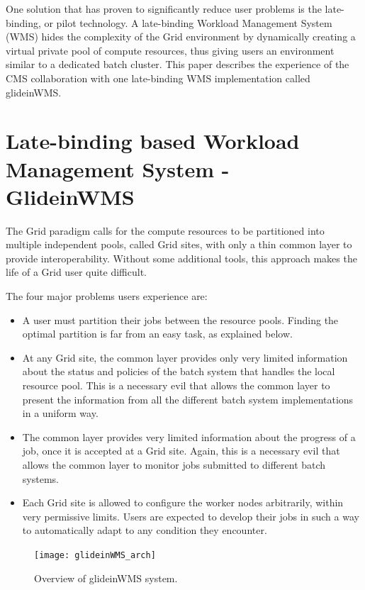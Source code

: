 \documentclass[a4paper]{jpconf}
\begin{document}
One solution that has proven to significantly reduce user problems is the late-binding, or pilot technology.  
A late-binding Workload Management System (WMS) hides the complexity of the Grid environment by dynamically creating 
a virtual private pool of compute resources, thus giving users an environment similar to a dedicated batch cluster.
This paper describes the experience of the CMS collaboration with one late-binding WMS implementation called glideinWMS. 
\section{Late-binding based Workload Management System - GlideinWMS }
The Grid paradigm calls for the compute resources to be partitioned into multiple independent pools, called Grid sites,
with only a thin common layer to provide interoperability.
Without some additional tools, this approach makes the life of a Grid user quite difficult. 

The four major problems users experience are:
\begin {itemize}
\item 
A user must partition their jobs between the resource pools.
Finding the optimal partition is far from an easy task, as explained below.
\item
At any Grid site, the common layer provides only very limited information about the status and policies of the
batch system that handles the local resource pool.
This is a necessary evil that allows the common layer to present the information from all the different batch system 
implementations in a uniform way. 
\item 
The common layer provides very limited information about the progress of a job, once it is accepted at a Grid site.
Again, this is a necessary evil that allows the common layer to monitor jobs submitted to different batch systems.  
\item
Each Grid site is allowed to configure the worker nodes arbitrarily, within very permissive limits.
Users are expected to develop their jobs in such a way to automatically adapt to any condition they encounter.
\end{itemize}
\begin{figure}
\begin{center}
\texttt{[image: glideinWMS\_arch]}
\end{center}
\caption{Overview of glideinWMS system.}
\label{fig:glideinWMS}
\end{figure}
\end{document}
